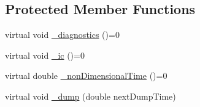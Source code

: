 \subsection*{Protected Member Functions}
\begin{DoxyCompactItemize}
\item 
virtual void \hyperlink{class_simulation___fluid_a6757a185fee17eeedf920c2bf8da2e44}{\+\_\+diagnostics} ()=0
\item 
virtual void \hyperlink{class_simulation___fluid_a98cc2ccad2d48a5ac38cb52d4c18824a}{\+\_\+ic} ()=0
\item 
virtual double \hyperlink{class_simulation___fluid_acc8ed78a2caec36b0591a8a7070a5c53}{\+\_\+non\+Dimensional\+Time} ()=0
\item 
virtual void \hyperlink{class_simulation___fluid_a66d6d98f4f758de2cf97dc63328eaab6}{\+\_\+dump} (double next\+Dump\+Time)
\end{DoxyCompactItemize}
